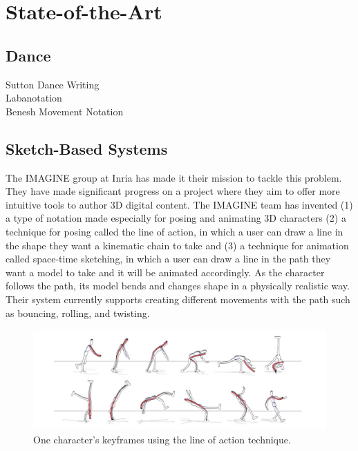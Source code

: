 \chapter{State-of-the-Art}\label{chap:sota}



\section{Dance}
Sutton Dance Writing\\
Labanotation\\
Benesh Movement Notation

\section{Sketch-Based Systems}
The IMAGINE group at Inria has made it their mission to tackle this problem. They have made significant progress on a project where they aim to offer more intuitive tools to author 3D digital content. The IMAGINE team has invented (1) a type of notation made especially for posing and animating 3D characters (2) a technique for posing called the line of action, in which a user can draw a line in the shape they want a kinematic chain to take and (3) a technique for animation called space-time sketching, in which a user can draw a line in the path they want a model to take and it will be animated accordingly. As the character follows the path, its model bends and changes shape in a physically realistic way. Their system currently supports creating different movements with the path such as bouncing, rolling, and twisting.

\begin{figure}[!h]
\includegraphics[scale=0.4]{img/baseline}
\caption{One character's keyframes using the line of action technique.}
\end{figure}

